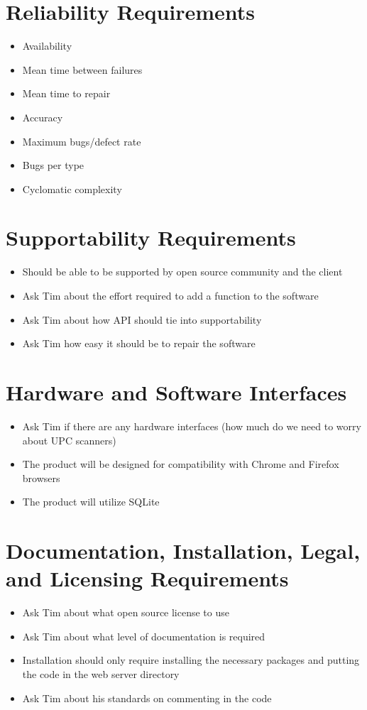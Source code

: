 \documentclass{article}
\begin{document}
\section{Reliability Requirements}
\begin{itemize}
\item Availability
\item Mean time between failures
\item Mean time to repair
\item Accuracy
\item Maximum bugs/defect rate
\item Bugs per type
\item Cyclomatic complexity
\end{itemize}

\section{Supportability Requirements}
\begin{itemize}
\item Should be able to be supported by open source community and the client
\item Ask Tim about the effort required to add a function to the software
\item Ask Tim about how API should tie into supportability
\item Ask Tim how easy it should be to repair the software
\end{itemize}

\section{Hardware and Software Interfaces}
\begin{itemize}
\item Ask Tim if there are any hardware interfaces (how much do we need to worry about UPC scanners)
\item The product will be designed for compatibility with Chrome and Firefox browsers
\item The product will utilize SQLite
\end{itemize}

\section{Documentation, Installation, Legal, and Licensing Requirements}
\begin{itemize}
\item Ask Tim about what open source license to use
\item Ask Tim about what level of documentation is required
\item Installation should only require installing the necessary packages and putting the code in the web server directory
\item Ask Tim about his standards on commenting in the code
\end{itemize}
\end{document}
